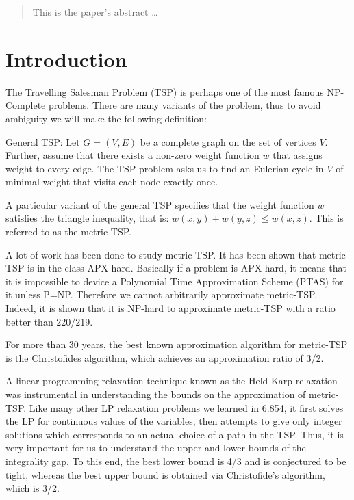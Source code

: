 \documentclass[12pt]{article}
\begin{document}
\maketitle

\begin{abstract}
This is the paper's abstract \ldots
\end{abstract}


\section{Introduction}
The Travelling Salesman Problem (TSP) is perhaps one of the most famous NP-Complete problems. There are many variants of the problem, thus to avoid ambiguity we will make the following definition:

General TSP: Let $G = (V,E)$ be a complete graph on the set of vertices $V$. Further, assume that there exists a non-zero weight function $w$ that assigns weight to every edge. The TSP problem asks us to find an Eulerian cycle in $V$ of minimal weight that visits each node exactly once.

A particular variant of the general TSP specifies that the weight function $w$ satisfies the triangle inequality, that is: $w(x,y)+w(y,z) \leq w(x,z)$. This is referred to as the metric-TSP.

A lot of work has been done to study metric-TSP. It has been shown that metric-TSP is in the class APX-hard. Basically if a problem is APX-hard, it means that it is impossible to device a Polynomial Time Approximation Scheme (PTAS) for it unless P=NP. Therefore we cannot arbitrarily approximate metric-TSP. Indeed, it is shown that it is NP-hard to approximate metric-TSP with a ratio better than 220/219.

For more than 30 years, the best known approximation algorithm for metric-TSP is the Christofides algorithm, which achieves an approximation ratio of 3/2.

A linear programming relaxation technique known as the Held-Karp relaxation was instrumental in understanding the bounds on the approximation of metric-TSP. Like many other LP relaxation problems we learned in 6.854, it first solves the LP for continuous values of the variables, then attempts to give only integer solutions which corresponds to an actual choice of a path in the TSP. Thus, it is very important for us to understand the upper and lower bounds of the integrality gap. To this end, the best lower bound is 4/3 and is conjectured to be tight, whereas the best upper bound is obtained via Christofide's algorithm, which is 3/2.
\end{document}
